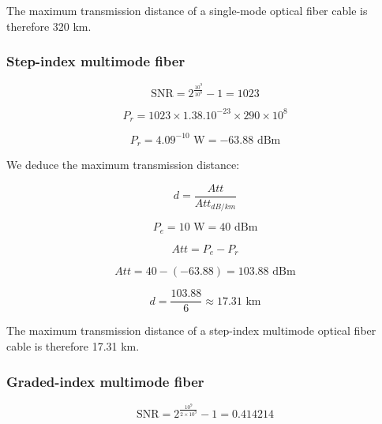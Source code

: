 \documentclass[12]{article}
\begin{document}
The maximum transmission distance of a single-mode optical fiber cable is therefore 320 km.

\subsubsection{Step-index multimode fiber}


\begin{equation*}
    \text{SNR} = 2^{ \frac{10^9}{10^{8}}} -1 = 1023
\end{equation*}

\begin{equation*}
    P_r = 1023 \times 1.38.10^{-23} \times 290 \times 10^{8}
\end{equation*}

\begin{equation*}
    P_r = 4.09^{-10} \text{ W} = -63.88 \text{ dBm}
\end{equation*}

We deduce the maximum transmission distance:

\begin{equation*}
    d = \frac{Att}{Att_{dB/km}}
\end{equation*}

\begin{equation*}
    P_e = 10 \text{ W} = 40 \text{ dBm}
\end{equation*}

\begin{equation*}
    Att = P_e - P_r
\end{equation*}

\begin{equation*}
    Att = 40 - \left( -63.88 \right) = 103.88 \text{ dBm}
\end{equation*}

\begin{equation*}
    d = \frac{103.88}{6} \approx 17.31 \text{ km}
\end{equation*}

The maximum transmission distance of a step-index multimode optical fiber cable is therefore 17.31 km.


\subsubsection{Graded-index multimode fiber}


\begin{equation*}
    \text{SNR} = 2^{ \frac{10^9}{2 \times 10^{9}}} -1 = 0.414214
\end{equation*}
\end{document}
